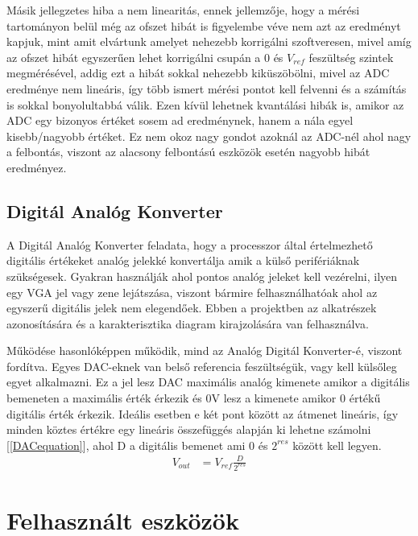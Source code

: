 Másik jellegzetes hiba a nem linearitás, ennek jellemzője, hogy a mérési 
tartományon belül még az ofszet hibát is figyelembe véve nem azt az eredményt 
kapjuk, mint amit elvártunk amelyet nehezebb korrigálni szoftveresen, mivel amíg 
az ofszet hibát egyszerűen lehet korrigálni csupán a 0 és $V_{ref}$ feszültség szintek 
megmérésével, addig ezt a hibát sokkal nehezebb kiküszöbölni, mivel az ADC 
eredménye nem lineáris, így több ismert mérési pontot kell felvenni és a számítás 
is sokkal bonyolultabbá válik. Ezen kívül lehetnek kvantálási hibák is, amikor az 
ADC egy bizonyos értéket sosem ad eredménynek, hanem a nála egyel kisebb/nagyobb 
értéket. Ez nem okoz nagy gondot azoknál az ADC-nél ahol nagy a felbontás, viszont 
az alacsony felbontású eszközök esetén nagyobb hibát eredményez.

\subsection{Digitál Analóg Konverter}

A Digitál Analóg Konverter feladata, hogy a processzor által értelmezhető digitális
értékeket analóg jelekké konvertálja amik a külső perifériáknak szükségesek.
Gyakran használják ahol pontos analóg jeleket kell vezérelni, ilyen egy VGA jel
vagy zene lejátszása, viszont bármire felhasználhatóak ahol az egyszerű digitális
jelek nem elegendőek. Ebben a projektben az alkatrészek azonosítására és a 
karakterisztika diagram kirajzolására van felhasználva.

Működése hasonlóképpen működik, mind az Analóg Digitál Konverter-é, viszont fordítva.
Egyes DAC-eknek van belső referencia feszültségük, vagy kell külsőleg egyet alkalmazni.
Ez a jel lesz DAC maximális analóg kimenete amikor a digitális bemeneten a maximális
érték érkezik és 0V lesz a kimenete amikor 0 értékű digitális érték érkezik. Ideális
esetben e két pont között az átmenet lineáris, így minden köztes értékre egy lineáris
összefüggés alapján ki lehetne számolni [\ref{DACequation}], ahol D a digitális bemenet
ami 0 és $2^{res}$ között kell legyen.
\begin{equation}
    \label{DACequation}
    \begin{split}
        V_{out} &= V_{ref} \frac{D}{2^{res}}
    \end{split}
    \end{equation}

\section{Felhasznált eszközök}



